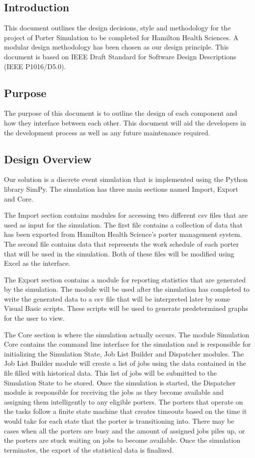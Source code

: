 \documentclass[paper=letter, fontsize=10pt]{scrartcl}
\numberwithin{equation}{section}		%
\numberwithin{figure}{section}			%
\numberwithin{table}{section}				%
\begin{document}
\subsection{Introduction}
This document outlines the design decisions, style and methodology for the project of Porter Simulation to be completed for Hamilton Health Sciences.  A modular design methodology has been chosen as our design principle.  This document is based on IEEE Draft Standard for Software Design Descriptions (IEEE P1016/D5.0).
\subsection{Purpose}
The purpose of this document is to outline the design of each component and how they interface between each other. This document will aid the developers in the development process as well as any future maintenance required.
\subsection{Design Overview}
Our solution is a discrete event simulation that is implemented using the Python library SimPy. The simulation has three main sections named Import, Export and Core. 

The Import section contains modules for accessing two different csv files that are used as input for the simulation. The first file contains a collection of data that has been exported from Hamilton Health Science's porter management system. The second file contains data that represents the work schedule of each porter that will be used in the simulation. Both of these files will be modified using Excel as the interface.

The Export section contains a module for reporting statistics that are generated by the simulation. The module will be used after the simulation has completed to write the generated data to a csv file that will be interpreted later by some Visual Basic scripts. These scripts will be used to generate predetermined graphs for the user to view.

The Core section is where the simulation actually occurs. The module Simulation Core contains the command line interface for the simulation and is responsible for initializing the Simulation State, Job List Builder and Dispatcher modules. The Job List Builder module will create a list of jobs using the data contained in the file filled with historical data. This list of jobs will be submitted to the Simulation State to be stored. Once the simulation is started, the Dispatcher module is responsible for receiving the jobs as they become available and assigning them intelligently to any eligible porters. The porters that operate on the tasks follow a finite state machine that creates timeouts based on the time it would take for each state that the porter is transitioning into. There may be cases when all the porters are busy and the amount of assigned jobs piles up, or the porters are stuck waiting on jobs to become available. Once the simulation terminates, the export of the statistical data is finalized.
\end{document}
